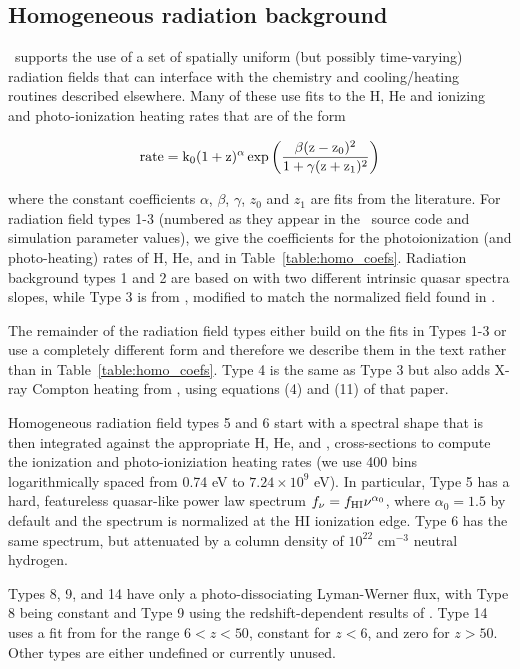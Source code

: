 \subsection{Homogeneous radiation background}
\label{sec.num.rad-homogeneous}

\enzo\ supports the use of a set of spatially uniform (but possibly
time-varying) radiation fields that can interface with the chemistry
and cooling/heating routines described elsewhere.  Many of these use
fits to the H, He and \Hep ionizing and photo-ionization heating
rates that are of the form

\begin{equation}
\rm{rate} = k_0  (1+z)^{\alpha}  \exp{\left( \frac{\beta (z-z_0)^2 }{1 + \gamma  (z+z_1)^2} \right)}
\label{eq:homo_rad_template}
\end{equation}

where the constant coefficients $\alpha$, $\beta$, $\gamma$, $z_0$ and
$z_1$ are fits from the literature.  For radiation field types 1-3
(numbered as they appear in the \enzo\ source code and simulation
parameter values), we
give the coefficients for the photoionization (and photo-heating)
rates of H, He, and \Hep in Table~\ref{table:homo_coefs}.  Radiation
background types 1
and 2 are based on \citet{1996ApJ...461...20H} with two different
intrinsic quasar spectra slopes, while Type 3 is from
\citet{2012ApJ...746..125H}, modified to match the normalized field
found in \citet{Kirkman05}.  

The remainder of the radiation field types either build on the fits in Types
1-3 or use a completely different form and therefore we describe them
in the text rather than in Table~\ref{table:homo_coefs}.
Type 4 is the same as Type 3 but also
adds X-ray Compton heating from \citet{MadauEfstathiou99}, using
equations (4) and (11) of that paper.

Homogeneous radiation field types 5 and 6 start with a spectral shape
that is then integrated against the appropriate H, He, and \Hep,
cross-sections to compute the ionization and photo-ioniziation heating
rates (we use 400 bins logarithmically spaced from 0.74 eV to $7.24
\times 10^9$ eV).  In particular, Type 5 has a hard, featureless
quasar-like power law spectrum $f_{\nu} = f_{\rm HI} \nu^{\alpha_0}$,
where $\alpha_0 = 1.5$ by default and the spectrum is normalized at
the HI ionization edge.  Type 6 has the same spectrum, but attenuated
by a column density of $10^{22}$ cm$^{-3}$ neutral hydrogen.  

Types 8, 9, and 14 have only a photo-dissociating Lyman-Werner flux,
with Type 8 being constant and Type 9 using the redshift-dependent
results of \citet{TrentiStiavelli09}.  Type 14 uses a fit from
\citet{WiseAbel05} for the range $6 < z < 50$, constant for $z<6$, and
zero for $z > 50$.  Other types are either undefined or currently unused.


